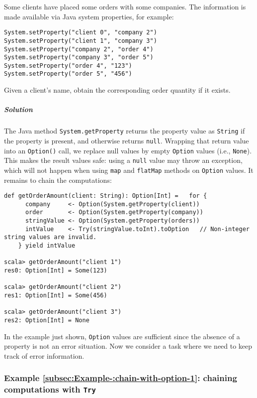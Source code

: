 Some clients have placed some orders with some companies. The information
is made available via Java system properties, for example:
\begin{lstlisting}
System.setProperty("client 0", "company 2")
System.setProperty("client 1", "company 3")
System.setProperty("company 2", "order 4")
System.setProperty("company 3", "order 5")
System.setProperty("order 4", "123")
System.setProperty("order 5", "456")
\end{lstlisting}
Given a client\textsf{'}s name, obtain the corresponding order quantity if
it exists.

\subparagraph{Solution}

The Java method \lstinline!System.getProperty! returns the property
value as \lstinline!String! if the property is present, and otherwise
returns \lstinline!null!. Wrapping that return value into an \lstinline!Option()!
call, we replace null values by empty \lstinline!Option! values (i.e.,
\lstinline!None!). This makes the result values safe: using a \lstinline!null!
value may throw an exception, which will not happen when using \lstinline!map!
and \lstinline!flatMap! methods on \lstinline!Option! values. It
remains to chain the computations:

\begin{lstlisting}
def getOrderAmount(client: String): Option[Int] =   for {
      company     <- Option(System.getProperty(client))
      order       <- Option(System.getProperty(company))
      stringValue <- Option(System.getProperty(orders))
      intValue    <- Try(stringValue.toInt).toOption   // Non-integer string values are invalid.
    } yield intValue

scala> getOrderAmount("client 1")
res0: Option[Int] = Some(123)

scala> getOrderAmount("client 2")
res1: Option[Int] = Some(456)

scala> getOrderAmount("client 3")
res2: Option[Int] = None
\end{lstlisting}

In the example just shown, \lstinline!Option! values are sufficient
since the absence of a property is not an error situation. Now we
consider a task where we need to keep track of error information.

\subsubsection{Example \label{subsec:Example-:chain-with-option-1}\ref{subsec:Example-:chain-with-option-1}:
chaining computations with \texttt{Try}}

